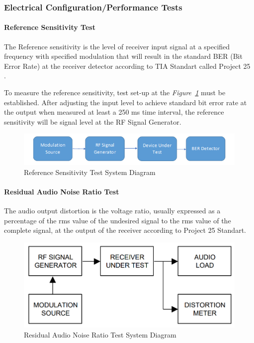 \subsubsection{Electrical Configuration/Performance Tests}
\- \indent


\paragraph{Reference Sensitivity Test}
\- \indent
	The Reference sensitivity is the level of receiver input signal at a specified frequency with specified modulation that will result in the standard BER (Bit Error Rate) at the receiver detector according to TIA Standart called Project 25 \cite{P25}.

	To measure the reference sensitivity, test set-up at the \textit{Figure~\ref{fig:refsens}} must be established. After adjusting the input level to achieve   standard bit error rate at the output when measured at least a 250 ms time interval, the reference sensitivity will be signal level at the RF Signal Generator.

\begin{figure}[H]
	\center
	\setlength{\unitlength}{\textwidth} 
	\includegraphics[width=1.0\unitlength]{refsens}
	\caption{\label{fig:refsens}Reference Sensitivity Test System Diagram }
\end{figure}

\paragraph{Residual Audio Noise Ratio Test}
\- \indent
	The audio output distortion is the voltage ratio, usually expressed as a percentage of the rms value of the undesired signal to the rms value of the complete signal, at the output of the receiver according to Project 25 Standart\cite{P25}.

\begin{figure}[H]
	\center
	\setlength{\unitlength}{\textwidth} 
	\includegraphics[width=0.75\unitlength]{resaudtest}
	\caption{\label{fig:resaudtest}Residual Audio Noise Ratio Test System Diagram }
\end{figure}

